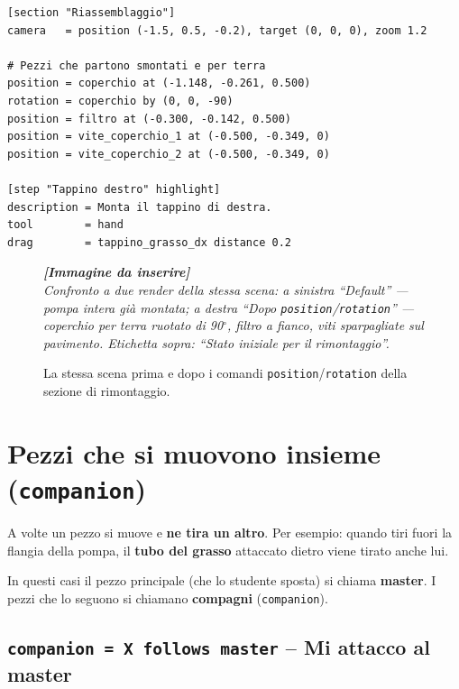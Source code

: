 ﻿\documentclass[a4paper,12pt,oneside]{book}
\newcommand{\val}[1]{\texttt{\color{cvtgreen}#1}}
\newcommand{\imgph}[2]{%
  \begin{tcolorbox}[colback=cvtlightblue!30,colframe=cvtblue!40,%
    width=#1,halign=center,valign=center,height=5cm,boxrule=0.5pt,arc=3pt]%
    \textcolor{cvtgray}{\itshape\footnotesize\textbf{[Immagine da inserire]}\\[3pt]#2}%
  \end{tcolorbox}}
\begin{document}
\begin{esempiocvt}
\begin{lstlisting}
[section "Riassemblaggio"]
camera   = position (-1.5, 0.5, -0.2), target (0, 0, 0), zoom 1.2

# Pezzi che partono smontati e per terra
position = coperchio at (-1.148, -0.261, 0.500)
rotation = coperchio by (0, 0, -90)
position = filtro at (-0.300, -0.142, 0.500)
position = vite_coperchio_1 at (-0.500, -0.349, 0)
position = vite_coperchio_2 at (-0.500, -0.349, 0)

[step "Tappino destro" highlight]
description = Monta il tappino di destra.
tool        = hand
drag        = tappino_grasso_dx distance 0.2
\end{lstlisting}
\end{esempiocvt}

\begin{figure}[H]
  \centering
  \imgph{13cm}{Confronto a due render della stessa scena: a sinistra ``Default'' --- pompa intera già montata; a destra ``Dopo \texttt{position}/\texttt{rotation}'' --- coperchio per terra ruotato di 90$^\circ$, filtro a fianco, viti sparpagliate sul pavimento. Etichetta sopra: ``Stato iniziale per il rimontaggio''.}
  \caption{La stessa scena prima e dopo i comandi \texttt{position}/\texttt{rotation} della sezione di rimontaggio.}
  \label{fig:prima-dopo-riassemblaggio}
\end{figure}

\chapter{Pezzi che si muovono insieme (\texttt{companion})}
\label{ch:companion}

A volte un pezzo si muove e \textbf{ne tira un altro}. Per esempio: quando tiri
fuori la flangia della pompa, il \textbf{tubo del grasso} attaccato dietro
viene tirato anche lui.

In questi casi il pezzo principale (che lo studente sposta) si chiama
\textbf{master}. I pezzi che lo seguono si chiamano \textbf{compagni}
(\val{companion}).

\section{\texttt{companion = X follows master} -- Mi attacco al master}
\end{document}
